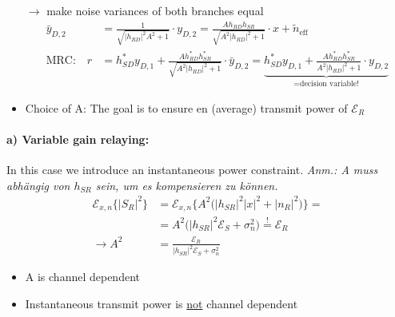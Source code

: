 \documentclass[a4paper, 10pt]{article}
\begin{document}
\begin{itemize}
	\item[$\rightarrow$] make noise variances of both branches equal
	\begin{align*}
		\bar{y}_{D,2} &= \frac{1}{\sqrt{|h_{RD}|^2A^2+1}}\cdot y_{D,2} = \frac{Ah_{RD}h_{SR}}{\sqrt{A^2|h_{RD}|^2 + 1}} \cdot x + \tilde{n}_{\text{eff}} \\
		\text{MRC:}\quad r &= h_{SD}^*y_{D,1} + \frac{Ah_{RD}^*h_{SR}^*}{\sqrt{A^2|h_{RD}|^2+1}}\cdot\bar{y}_{D,2} = \underbrace{h_{SD}^*y_{D,1} + \frac{Ah_{RD}^*h_{SR}^*}{A^2|h_{RD}|^2 + 1}\cdot y_{D,2}}_{ = \text{decision variable!}}		
	\end{align*}
	\item Choice of A: The goal is to ensure en (average) transmit power of $\mathcal{E}_R $	
\end{itemize}
\paragraph{a) Variable gain relaying:}
In this case we introduce an instantaneous power constraint. \textit{Anm.: A muss abh\"angig von $h_{SR} $ sein, um es kompensieren zu k\"onnen.}
\begin{align*}
	\mathcal{E}_{x,n}\bigl\{|S_R|^2\bigr\} &= \mathcal{E}_{x,n}\bigl\{A^2\bigl(|h_{SR}|^2|x|^2 + |n_R|^2\bigr)\bigr\} = \\ &= A^2\bigl(|h_{SR}|^2\mathcal{E}_S + \sigma_n^2\bigr) \overset{!}{=} \mathcal{E}_R \\ \rightarrow A^2 &= \frac{\mathcal{E}_R}{|h_{SR}|^2\mathcal{E}_S + \sigma_n^2}	 
\end{align*}
\begin{itemize}
	\item A is channel dependent
	\item Instantaneous transmit power is \underline{not} channel dependent 
\end{itemize}
\end{document}
